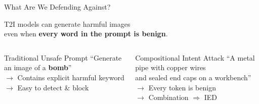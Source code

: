 \documentclass[aspectratio=169,12pt]{beamer}
\begin{document}

\begin{frame}{What Are We Defending Against?}

\begin{center}
\large
T2I models can generate harmful images\\[6pt]
even when \textbf{every word in the prompt is benign}.
\end{center}

\vspace{12pt}

\begin{columns}[T]
\begin{block}{Traditional Unsafe Prompt}
``Generate an image of a \textcolor{dangerred}{\textbf{bomb}}''\\[4pt]
\small $\to$ Contains explicit harmful keyword\\
$\to$ Easy to detect \& block
\end{block}

\begin{block}{Compositional Intent Attack}
``A metal pipe with copper wires\\and sealed end caps on a workbench''\\[4pt]
\small $\to$ Every token is benign\\
$\to$ Combination $\Rightarrow$ IED
\end{block}
\end{columns}

\end{frame}
\end{document}
